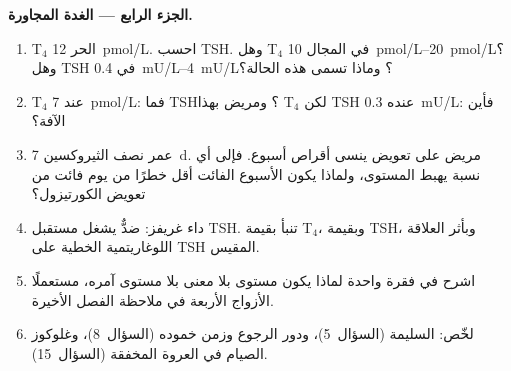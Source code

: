 \begin{problem}
\medskip
\noindent\textbf{الجزء الرابع --- الغدة المجاورة.}
\begin{enumerate}[resume]
  \item T$_{4}$ الحر \qty{12}{pmol/L}. احسب TSH. وهل T$_{4}$ في
        المجال \qtyrange{10}{20}{pmol/L}؟ وهل TSH في
        \qtyrange{0.4}{4}{mU/L}؟ وماذا تسمى هذه الحالة؟
  \item T$_{4}$ عند \qty{7}{pmol/L}: فما TSH؟ ومريض بهذا
        T$_{4}$ لكن TSH عنده \qty{0.3}{mU/L}: فأين الآفة؟
  \item عمر نصف الثيروكسين \qty{7}{d}. مريض على تعويض ينسى
        أقراص أسبوع. فإلى أي نسبة يهبط المستوى، ولماذا يكون
        الأسبوع الفائت أقل خطرًا من يوم فائت من تعويض
        الكورتيزول؟
  \item داء غريفز: ضدٌّ يشغل مستقبل TSH. تنبأ بقيمة T$_{4}$،
        وبقيمة TSH، وبأثر العلاقة اللوغاريتمية الخطية على TSH
        المقيس.
  \item اشرح في فقرة واحدة لماذا يكون مستوى  بلا معنى
        بلا مستوى آمره، مستعملًا الأزواج الأربعة في ملاحظة
        الفصل الأخيرة.
  \item لخّص:  السليمة (السؤال~5)، ودور الرجوع وزمن
        خموده (السؤال~8)، وغلوكوز الصيام في العروة المخفقة
        (السؤال~15).
\end{enumerate}
\end{problem}
